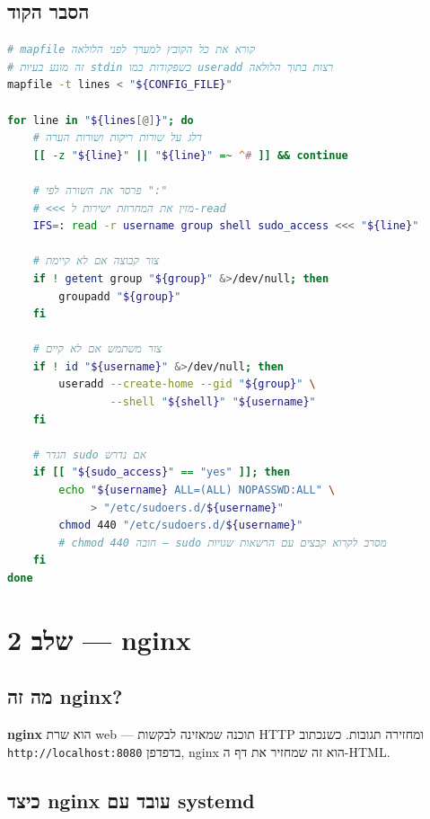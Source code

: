 \documentclass[12pt,a4paper]{article}
\begin{document}
\subsection{הסבר הקוד}

\begin{lstlisting}[language=bash, caption={create\_users.sh — חלק מרכזי}]
# mapfile קורא את כל הקובץ למערך לפני הלולאה
# זה מונע בעיות stdin כשפקודות כמו useradd רצות בתוך הלולאה
mapfile -t lines < "${CONFIG_FILE}"

for line in "${lines[@]}"; do
    # דלג על שורות ריקות ושורות הערה
    [[ -z "${line}" || "${line}" =~ ^# ]] && continue

    # פרסר את השורה לפי ":"
    # <<< מזין את המחרוזת ישירות ל-read
    IFS=: read -r username group shell sudo_access <<< "${line}"

    # צור קבוצה אם לא קיימת
    if ! getent group "${group}" &>/dev/null; then
        groupadd "${group}"
    fi

    # צור משתמש אם לא קיים
    if ! id "${username}" &>/dev/null; then
        useradd --create-home --gid "${group}" \
                --shell "${shell}" "${username}"
    fi

    # הגדר sudo אם נדרש
    if [[ "${sudo_access}" == "yes" ]]; then
        echo "${username} ALL=(ALL) NOPASSWD:ALL" \
             > "/etc/sudoers.d/${username}"
        chmod 440 "/etc/sudoers.d/${username}"
        # chmod 440 חובה — sudo מסרב לקרוא קבצים עם הרשאות שגויות
    fi
done
\end{lstlisting}

\newpage
\section{שלב 2 — nginx}

\subsection{מה זה nginx?}

\textbf{nginx} הוא שרת web — תוכנה שמאזינה לבקשות HTTP ומחזירה תגובות. כשנכתוב \texttt{http://localhost:8080} בדפדפן, nginx הוא זה שמחזיר את דף ה-HTML.

\subsection{כיצד nginx עובד עם systemd}
\end{document}
